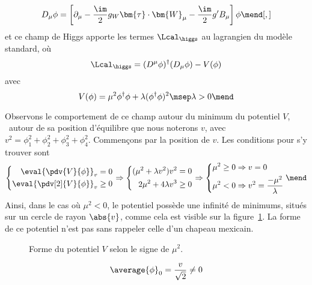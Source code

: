 \begin{equation}
D_\mu \phi = \left[ \partial_\mu - \frac{\im}{2}g_W \bm{\tau}\cdot\bm{W}_\mu - \frac{\im}{2}g'B_\mu \right] \phi
\mend[,]
\end{equation}
et ce champ de Higgs apporte les termes $\Lcal_{\higgs}$ au lagrangien du modèle standard, où
\begin{equation}
\Lcal_{\higgs} = (D^\mu\phi)^\dagger(D_\mu\phi) - V(\phi)
\end{equation}
avec
\begin{equation}
V(\phi)
= \mu^2\phi^\dagger\phi + \lambda (\phi^\dagger\phi)^2
\msep \lambda > 0
\mend
\end{equation}
\par Observons le comportement de ce champ autour du minimum du potentiel $V$, \ie\ autour de sa position d'équilibre que nous noterons $v$, avec $v^2=\phi_1^2+\phi_2^2+\phi_3^2+\phi_4^2$.
Commençons par la position de $v$. Les conditions pour s'y trouver sont
\begin{equation}
\left\lbrace
\begin{aligned}
\eval{\pdv{V}{\phi}}_v=0
\\
\eval{\pdv[2]{V}{\phi}}_v\geq0
\end{aligned}
\right.
\Rightarrow
\left\lbrace
\begin{aligned}
(\mu^2 + \lambda v^2)v^2 = 0
\\
2\mu^2 + 4\lambda v^3 \geq0
\end{aligned}
\right.
\Rightarrow
\left\lbrace
\begin{aligned}
\mu^2 \geq 0 &\Rightarrow v = 0
\\
\mu^2 < 0 &\Rightarrow v^2 = \frac{-\mu^2}{\lambda}
\end{aligned}
\right.
\mend
\end{equation}
Ainsi, dans le cas où $\mu^2<0$, le potentiel possède une infinité de minimums, situés sur un cercle de rayon $\abs{v}$, comme cela est visible sur la figure~\ref{fig-rpztation_3d_V_Higgs}. La forme de ce potentiel n'est pas sans rappeler celle d'un chapeau mexicain.
\begin{figure}[h]
\centering

\caption{Forme du potentiel $V$ selon le signe de $\mu^2$.}
\label{fig-rpztation_3d_V_Higgs}
\end{figure}
\par {}
\begin{equation}
\average{\phi}_0 = \frac{v}{\sqrt{2}} \neq 0
\end{equation}
